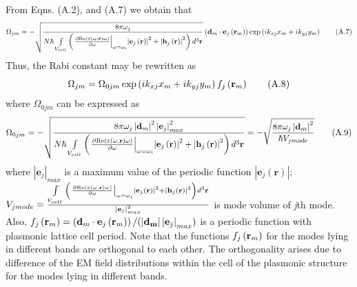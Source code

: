 \documentclass[aps,pra,amsmath,amssymb,onecolumn,superscriptaddress,showpacs,floatfix,]{revtex4-1}
\begin{document}
From Eqns. (A.2), and (A.7) we obtain that
\begin{equation}
{\Omega _{jm}} =-\sqrt{\frac{{8\pi \omega _j}}{{N \hbar} \int\limits_{{V_{cell}}} {\left( {{{\left. {\frac{{\partial {\mathop{\rm Re}\nolimits} \left( {\varepsilon(\omega, \textbf{r}) \omega } \right)}}{{\partial \omega }}} \right|}_{\omega  = {\omega _i}}}{{\left| {{{\bf{e}}_j}\left( {\bf{r}} \right)} \right|}^2} + {{\left| {{{\bf{h}}_j}\left( {\bf{r}} \right)} \right|}^2}} \right){d^3}{\bf{r}}}}} \left( {{{\bf{d}}_m} \cdot {{\bf{e}}_j}\left( {{{\bf{r}}_m}} \right)} \right)\exp \left( {i{k_{xj}}{x_m} + i{k_{yj}}{y_m}} \right) \tag{A.7}
\end{equation}
Thus, the Rabi constant may be rewritten as
\begin{equation}
{\Omega _{jm}} = {\Omega _{0jm}}\exp \left( {i{k_{xj}}{x_m} + i{k_{yj}}{y_m}} \right){f_j}\left( {{{\bf{r}}_m}} \right) \tag{A.8}
\end{equation}
where $\Omega _{0jm}$ can be expressed as
\begin{equation}
{\Omega _{0jm}} =-\sqrt{\frac{{8\pi \omega _j \left|\textbf{d}_m\right|^2 \left|\textbf{e}_{j}\right|_{max}^2}}{{N \hbar} \int\limits_{{V_{cell}}} {\left( {{{\left. {\frac{{\partial {\mathop{\rm Re}\nolimits} \left( {\varepsilon(\omega, \textbf{r}) \omega } \right)}}{{\partial \omega }}} \right|}_{\omega  = {\omega _i}}}{{\left| {{{\bf{e}}_j}\left( {\bf{r}} \right)} \right|}^2} + {{\left| {{{\bf{h}}_j}\left( {\bf{r}} \right)} \right|}^2}} \right){d^3}{\bf{r}}}}} = -\sqrt{\frac{{8\pi \omega _j \left|\textbf{d}_m\right|^2}}{\hbar V_{j mode}}} \tag{A.9}
\end{equation}
where $\left|\textbf{e}_{j}\right|_{max}$ is a maximum value of the periodic function $\left|\textbf{e}_{j}(\textbf{r})\right|$; $V_{j mode}=\frac{\int\limits_{{V_{cell}}} {\left( {{{\left. {\frac{{\partial {\mathop{\rm Re}\nolimits} \left( {\varepsilon(\omega, \textbf{r}) \omega } \right)}}{{\partial \omega }}} \right|}_{\omega  = {\omega _i}}}{{\left| {{{\bf{e}}_j}\left( {\bf{r}} \right)} \right|}^2} + {{\left| {{{\bf{h}}_j}\left( {\bf{r}} \right)} \right|}^2}} \right){d^3}{\bf{r}}}}{\left|\textbf{e}_{j}\right|_{max}^2}$ is mode volume of \textit{j}th mode.
Also, ${f_j}\left( {{{\bf{r}}_m}} \right) = \left( {{{\bf{d}}_m} \cdot {{\bf{e}}_j}\left( {{{\bf{r}}_m}} \right)} \right)/(\left|\bf{d}_m\right| \left|\textbf{e}_{j}\right|_{max})$ is a periodic function with plasmonic lattice cell period. Note that the functions ${f_j}\left( {{{\bf{r}}_m}} \right)$ for the modes lying in different bands are orthogonal to each other. The orthogonality arises due to difference of the EM field distributions within the cell of the plasmonic structure for the modes lying in different bands.
\end{document}
